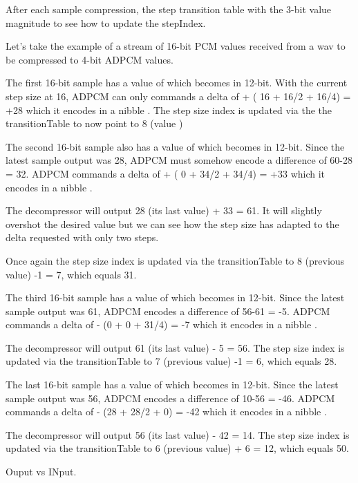 After each sample compression, the step transition table with the 3-bit value magnitude to see how to update the stepIndex.

 

Let's take the example of a stream of 16-bit PCM values received from a wav to be compressed to 4-bit ADPCM values.



The first 16-bit sample has a value of  which becomes  in 12-bit. With the current step size at 16, ADPCM can only commands a delta of + ( 16 + 16/2 + 16/4) = +28 which it encodes in a nibble . The step size index is updated via the the transitionTable to now point to 8 (value )

The second 16-bit sample also has a value of  which becomes  in 12-bit. Since the latest sample output was 28, ADPCM must somehow encode a difference of 60-28 = 32. ADPCM commands a delta of + ( 0 + 34/2 + 34/4) = +33 which it encodes in a nibble . 

The decompressor will output 28 (its last value) + 33 = 61. It will slightly overshot the desired value but we can see how the step size has adapted to the delta requested with only two steps. 

Once again the step size index is updated via the transitionTable to 8 (previous value) -1 = 7, which equals 31.

The third 16-bit sample has a value of  which becomes  in 12-bit. Since the latest sample output was 61, ADPCM encodes a difference of 56-61 = -5. ADPCM commands a delta of - (0 + 0 + 31/4) = -7 which it encodes in a nibble . 

The decompressor will output 61 (its last value) - 5 = 56. The step size index is updated via the transitionTable to 7 (previous value) -1 = 6, which equals 28.

The last 16-bit sample has a value of  which becomes  in 12-bit. Since the latest sample output was 56, ADPCM encodes a difference of 10-56 = -46. ADPCM commands a delta of - (28 + 28/2 + 0) = -42 which it encodes in a nibble . 

The decompressor will output 56 (its last value) - 42 = 14. The step size index is updated via the transitionTable to 6 (previous value) + 6 = 12, which equals 50.

Ouput vs INput.

